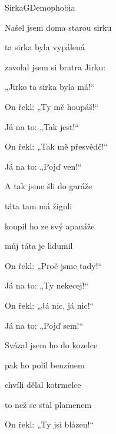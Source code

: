 \begin{song}{Sirka}{G}{Demophobia}

\Ch{[ Emi}{}   \Ch{G]}{}

\begin{SBChorus*}

Našel jsem doma starou sirku

ta sirka byla vypálená

zavolal jsem si bratra Jirku:

„Jirko ta sirka byla má!“

\end{SBChorus*}

\begin{SBChorus*}
\begin{itshape}
On řekl: „Ty mě houpáš!“

Já na to: „Tak jest!“

On řekl: „Tak mě přesvědč!“

Já na to: „Pojď ven!“
\end{itshape}
\end{SBChorus*}

\begin{SBChorus*}

A tak jsme šli do garáže

táta tam má žiguli

koupil ho ze svý apanáže

můj táta je lidumil

\end{SBChorus*}

\begin{SBChorus*}
\begin{itshape}
On řekl: „Proč jsme tady!“

Já na to: „Ty nekecej!“

On řekl: „Já nic, já nic!“

Já na to: „Pojď sem!“
\end{itshape}
\end{SBChorus*}

\begin{SBChorus*}

Svázal jsem ho do kozelce

pak ho polil benzínem

chvíli dělal kotrmelce

to než se stal plamenem

\end{SBChorus*}

\begin{SBChorus*}
\begin{itshape}
On řekl: „Ty jsi blázen!“


\end{itshape}
\end{SBChorus*}
\end{song}
